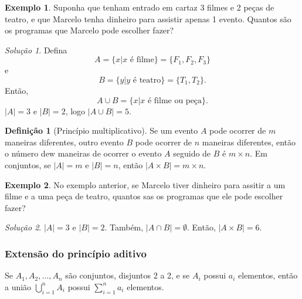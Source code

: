 \documentclass[]{book}
\theoremstyle{definition}
\newtheorem{definition}{Definição}[chapter]
\theoremstyle{definition}
\newtheorem{example}{Exemplo}[chapter]
\theoremstyle{definition}
\theoremstyle{remark}
\newtheorem*{solution}{Solução}
\begin{document}
\begin{example}
\protect\hypertarget{exm:unnamed-chunk-40}{}{\label{exm:unnamed-chunk-40} }Suponha que tenham entrado em cartaz 3 filmes e 2 peças de teatro, e que Marcelo tenha dinheiro para assistir apenas 1 evento.
Quantos são os programas que Marcelo pode escolher fazer?
\end{example}

\begin{solution}
\iffalse{} {Solução. } \fi{}Defina \[A = \{x \vert x \text{ é filme}\} = \{F_1, F_2, F_3\}\]
e
\[B = \{y \vert y \text{ é teatro}\} = \{T_1, T_2\}.\]
Então,
\[A \cup B = \{x \vert x \text{ é filme ou peça}\}.\]
\(\vert A \vert = 3\) e \(\vert B \vert = 2\), logo \(\vert A \cup B \vert = 5\).
\end{solution}

\begin{definition}[Princípio multiplicativo]
\protect\hypertarget{def:defMultiplicativo}{}{\label{def:defMultiplicativo} \iffalse (Princípio multiplicativo) \fi{} }Se um evento \(A\) pode ocorrer de \(m\) maneiras diferentes, outro evento \(B\) pode ocorrer de \(n\) maneiras diferentes, então o número dew maneiras de ocorrer o evento \(A\) seguido de \(B\) é \(m\times n\).
Em conjuntos, se \(|A|=m\) e \(|B|=n\), então \(|A\times B| = m \times n\).
\end{definition}

\begin{example}
\protect\hypertarget{exm:unnamed-chunk-42}{}{\label{exm:unnamed-chunk-42} }No exemplo anterior, se Marcelo tiver dinheiro para assitir a um filme e a uma peça de teatro, quantos sas os programas que ele pode escolher fazer?
\end{example}

\begin{solution}
\iffalse{} {Solução. } \fi{}\(|A|=3\) e \(|B|=2\).
Também, \(|A\cap B| = \emptyset\).
Então, \(|A \times B| = 6.\)
\end{solution}

\hypertarget{extensuxe3o-do-princuxedpio-aditivo}{%
\subsubsection*{Extensão do princípio aditivo}\label{extensuxe3o-do-princuxedpio-aditivo}}

Se \(A_1, A_2, \ldots, A_n\) são conjuntos, disjuntos 2 a 2, e se \(A_i\) possui \(a_i\) elementos, então a união \(\bigcup_{i=1}^{n}A_i\) possui \(\sum_{i=1}^{n}a_i\) elementos.
\end{document}
